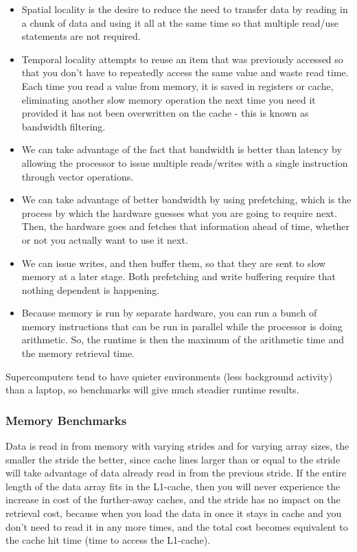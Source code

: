\documentclass[10pt]{article}
\begin{document}
\begin{flushleft}
\begin{itemize}
\item Spatial locality is the desire to reduce the need to transfer data by reading in a chunk of data and using it all at the same time so that multiple read/use statements are not required.
\item Temporal locality attempts to reuse an item that was previously accessed so that you don't have to repeatedly access the same value and waste read time. Each time you read a value from memory, it is saved in registers or cache, eliminating another slow memory operation the next time you need it provided it has not been overwritten on the cache - this is known as bandwidth filtering.
\item We can take advantage of the fact that bandwidth is better than latency by allowing the processor to issue multiple reads/writes with a single instruction through vector operations.
\item We can take advantage of better bandwidth by using prefetching, which is the process by which the hardware guesses what you are going to require next. Then, the hardware goes and fetches that information ahead of time, whether or not you actually want to use it next.
\item We can issue writes, and then buffer them, so that they are sent to slow memory at a later stage. Both prefetching and write buffering require that nothing dependent is happening.
\item Because memory is run by separate hardware, you can run a bunch of memory instructions that can be run in parallel while the processor is doing arithmetic. So, the runtime is then the maximum of the arithmetic time and the memory retrieval time.
\end{itemize}

Supercomputers tend to have quieter environments (less background activity) than a laptop, so benchmarks will give much steadier runtime results. 

\subsubsection{Memory Benchmarks}

Data is read in from memory with varying strides and for varying array sizes, the smaller the stride the better, since cache lines larger than or equal to the stride will take advantage of data already read in from the previous stride. If the entire length of the data array fits in the L1-cache, then you will never experience the increase in cost of the further-away caches, and the stride has no impact on the retrieval cost, because when you load the data in once it stays in cache and you don't need to read it in any more times, and the total cost becomes equivalent to the cache hit time (time to access the L1-cache).


\end{flushleft}
\end{document}

